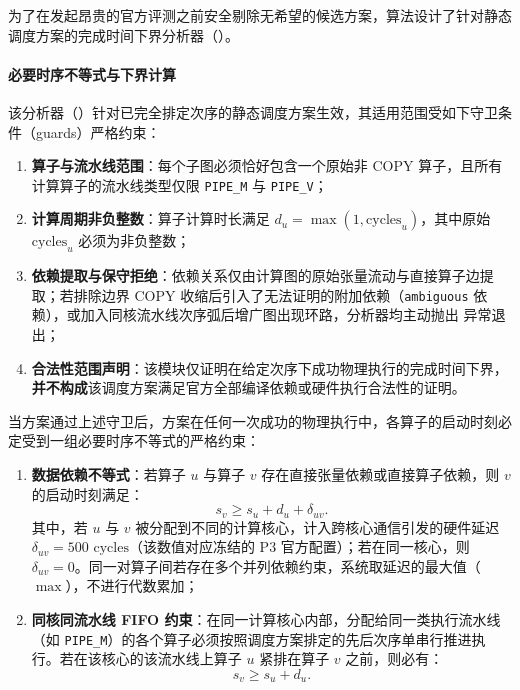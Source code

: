 \documentclass[anonymous,withtoc]{gmcm2026}
\providecommand{\tightlist}{\setlength{\itemsep}{0pt}\setlength{\parskip}{0pt}}
\begin{document}
为了在发起昂贵的官方评测之前安全剔除无希望的候选方案，算法设计了针对静态调度方案的完成时间下界分析器（\texttt{}）。

\paragraph{必要时序不等式与下界计算}

该分析器（\texttt{}）针对已完全排定次序的静态调度方案生效，其适用范围受如下守卫条件（guards）严格约束：

\begin{enumerate}
\def\labelenumi{\arabic{enumi}.}
\tightlist
\item
  \textbf{算子与流水线范围}：每个子图必须恰好包含一个原始非 COPY 算子，且所有计算算子的流水线类型仅限 \texttt{PIPE\_M} 与 \texttt{PIPE\_V}；
\item
  \textbf{计算周期非负整数}：算子计算时长满足 \(d_u = \max(1, \text{cycles}_u)\)，其中原始 \(\text{cycles}_u\) 必须为非负整数；
\item
  \textbf{依赖提取与保守拒绝}：依赖关系仅由计算图的原始张量流动与直接算子边提取；若排除边界 COPY 收缩后引入了无法证明的附加依赖（\texttt{ambiguous} 依赖），或加入同核流水线次序弧后增广图出现环路，分析器均主动抛出 \texttt{} 异常退出；
\item
  \textbf{合法性范围声明}：该模块仅证明在给定次序下成功物理执行的完成时间下界，\textbf{并不构成}该调度方案满足官方全部编译依赖或硬件执行合法性的证明。
\end{enumerate}

当方案通过上述守卫后，方案在任何一次成功的物理执行中，各算子的启动时刻必定受到一组必要时序不等式的严格约束：

\begin{enumerate}
\def\labelenumi{\arabic{enumi}.}
\tightlist
\item
  \textbf{数据依赖不等式}：若算子 \(u\) 与算子 \(v\) 存在直接张量依赖或直接算子依赖，则 \(v\) 的启动时刻满足： \begin{equation}
s_v \ge s_u + d_u + \delta_{uv}.
\end{equation} 其中，若 \(u\) 与 \(v\) 被分配到不同的计算核心，计入跨核心通信引发的硬件延迟 \(\delta_{uv} = 500\text{ cycles}\)（该数值对应冻结的 P3 官方配置）；若在同一核心，则 \(\delta_{uv} = 0\)。同一对算子间若存在多个并列依赖约束，系统取延迟的最大值（\(\max\)），不进行代数累加；
\item
  \textbf{同核同流水线 FIFO 约束}：在同一计算核心内部，分配给同一类执行流水线（如 \texttt{PIPE\_M}）的各个算子必须按照调度方案排定的先后次序单串行推进执行。若在该核心的该流水线上算子 \(u\) 紧排在算子 \(v\) 之前，则必有： \begin{equation}
s_v \ge s_u + d_u.
\end{equation}
\end{enumerate}
\end{document}
